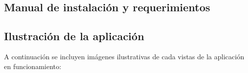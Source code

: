 \documentclass[11pt,a4paper]{article}
\begin{document}
\subsection{Manual de instalación y requerimientos}\label{Manual} 
\medskip 

\subsection{Ilustración de la aplicación}\label{IlustracionApp} 
A continuación se incluyen imágenes ilustrativas de cada vistas de la aplicación en funcionamiento:

\begin{figure}[H]
\centering
{}
\end{figure}
\begin{figure}[H]
\centering
{}
\end{figure}
\end{document}
